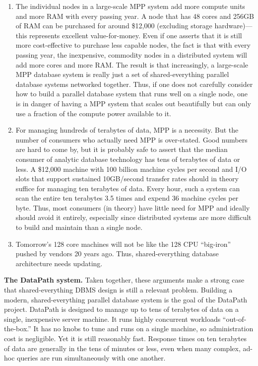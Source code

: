\documentclass{sig-alternate}
\renewcommand\:{\colon} %
\begin{document}
\begin{enumerate}

\item The individual nodes in a large-scale MPP system add more compute units and more RAM with every passing year.
A node that has 48 cores and
256GB of RAM can be purchased for around \$12,000 (excluding storage hardware)---this represents excellent value-for-money. Even if one asserts that
it is still more cost-effective to purchase less capable nodes, the fact is that with
every passing year, the inexpensive, commodity nodes in a distributed system will add more cores and more RAM.
The result is that increasingly, a large-scale MPP database system is really just a set of shared-everything 
parallel database systems networked together.
Thus, if one does not carefully consider how to build a parallel database
system that runs well on a single node, one is in 
danger of having a MPP system that scales out beautifully but can only
use a fraction of the compute power available to it.

\item For managing hundreds of terabytes of data, MPP is a necessity. But 
the number of consumers who actually need MPP is over-stated.
Good numbers are hard to come by, but
it is probably safe to assert that the median consumer of analytic database technology has tens of terabytes of data or less.
A \$12,000 machine with 100 billion machine cycles per second and I/O slots that support sustained 10GB/second
transfer rates should in theory suffice for managing ten terabytes of data.  Every hour, such a system can scan the entire ten terabytes 
3.5 times and expend 36 machine cycles per byte.  
Thus, most consumers (in theory) have little need for MPP and ideally should avoid it entirely, especially since distributed systems are
more difficult to build and maintain than a single node.

\item Tomorrow's 128 core machines will not be like the 128 CPU ``big-iron'' pushed by vendors 20 years ago. 
Thus, shared-everything database architecture needs updating.

\end{enumerate}

\vspace{5 pt}
\noindent
\noindent \textbf{The DataPath system.}
Taken together, these arguments make a strong case that shared-everything DBMS design is still a relevant problem.
Building a modern, shared-everything parallel database system 
is the goal of the DataPath project.  DataPath is  
designed to manage up to tens of terabytes of data on a single, inexpensive server machine.  It runs 
highly concurrent workloads ``out-of-the-box.'' It has no knobs to tune and runs on a single machine, 
so administration cost is negligible.  Yet it is still reasonably fast. Response times on ten terabytes 
of data are generally in the tens of minutes or less, even when many complex, ad-hoc queries are run 
simultaneously with one another.
\end{document}
